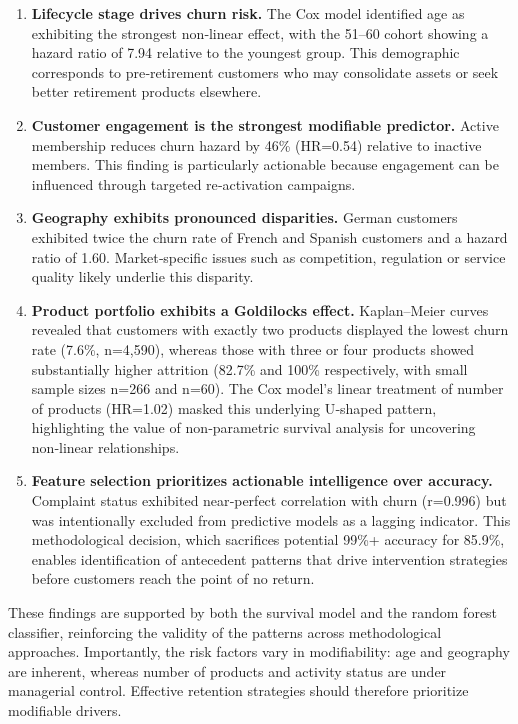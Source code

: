 \documentclass[12pt]{article}
\begin{document}
\begin{enumerate}
  \item \textbf{Lifecycle stage drives churn risk.} The Cox model identified age as exhibiting the strongest non‑linear effect, with the 51–60 cohort showing a hazard ratio of 7.94 relative to the youngest group. This demographic corresponds to pre‑retirement customers who may consolidate assets or seek better retirement products elsewhere.

  \item \textbf{Customer engagement is the strongest modifiable predictor.} Active membership reduces churn hazard by 46\% (HR=0.54) relative to inactive members. This finding is particularly actionable because engagement can be influenced through targeted re‑activation campaigns.

  \item \textbf{Geography exhibits pronounced disparities.} German customers exhibited twice the churn rate of French and Spanish customers and a hazard ratio of 1.60. Market‑specific issues such as competition, regulation or service quality likely underlie this disparity.

  \item \textbf{Product portfolio exhibits a Goldilocks effect.} Kaplan–Meier curves revealed that customers with exactly two products displayed the lowest churn rate (7.6\%, n=4,590), whereas those with three or four products showed substantially higher attrition (82.7\% and 100\% respectively, with small sample sizes n=266 and n=60). The Cox model's linear treatment of number of products (HR=1.02) masked this underlying U‑shaped pattern, highlighting the value of non‑parametric survival analysis for uncovering non‑linear relationships.

  \item \textbf{Feature selection prioritizes actionable intelligence over accuracy.} Complaint status exhibited near‑perfect correlation with churn (r=0.996) but was intentionally excluded from predictive models as a lagging indicator. This methodological decision, which sacrifices potential 99\%+ accuracy for 85.9\%, enables identification of antecedent patterns that drive intervention strategies before customers reach the point of no return.
\end{enumerate}

These findings are supported by both the survival model and the random forest classifier, reinforcing the validity of the patterns across methodological approaches. Importantly, the risk factors vary in modifiability: age and geography are inherent, whereas number of products and activity status are under managerial control. Effective retention strategies should therefore prioritize modifiable drivers.
\end{document}
